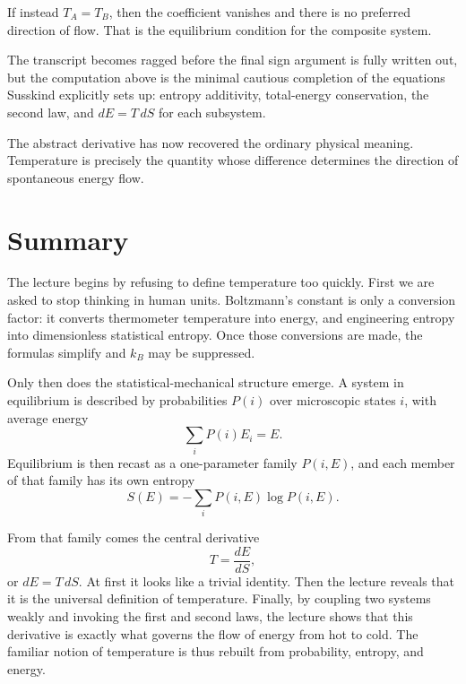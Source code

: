 If instead \(T_A = T_B\), then the coefficient vanishes and there is no preferred direction of flow. That is the equilibrium condition for the composite system.

\begin{remark}
The transcript becomes ragged before the final sign argument is fully written out, but the computation above is the minimal cautious completion of the equations Susskind explicitly sets up: entropy additivity, total-energy conservation, the second law, and \(dE = T\,dS\) for each subsystem.
\end{remark}

The abstract derivative has now recovered the ordinary physical meaning. Temperature is precisely the quantity whose difference determines the direction of spontaneous energy flow.

\section{Summary}

The lecture begins by refusing to define temperature too quickly. First we are asked to stop thinking in human units. Boltzmann's constant is only a conversion factor: it converts thermometer temperature into energy, and engineering entropy into dimensionless statistical entropy. Once those conversions are made, the formulas simplify and \(k_B\) may be suppressed.

Only then does the statistical-mechanical structure emerge. A system in equilibrium is described by probabilities \(P(i)\) over microscopic states \(i\), with average energy
\[
\sum_i P(i)E_i = E.
\]
Equilibrium is then recast as a one-parameter family \(P(i,E)\), and each member of that family has its own entropy
\[
S(E) = -\sum_i P(i,E)\log P(i,E).
\]

From that family comes the central derivative
\[
T = \frac{dE}{dS},
\]
or \(dE = T\,dS\). At first it looks like a trivial identity. Then the lecture reveals that it is the universal definition of temperature. Finally, by coupling two systems weakly and invoking the first and second laws, the lecture shows that this derivative is exactly what governs the flow of energy from hot to cold. The familiar notion of temperature is thus rebuilt from probability, entropy, and energy.